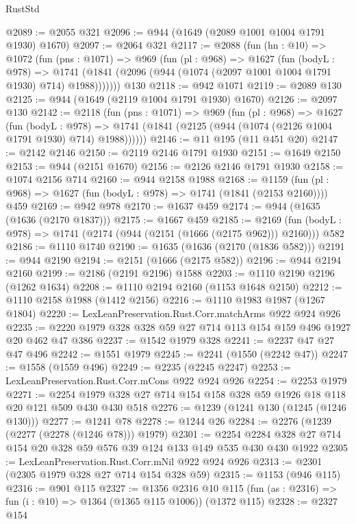 \begin{lexlean}{RustStd}
\begin{coremodule}
{\begin{coremodule}
{{{{{{{{{{@2089 := @2055 @321
@2096 := @944 (@1649 (@2089 @1001 @1004 @1791 @1930) @1670)
@2097 := @2064 @321
@2117 := @2088
    (fun (hn : @10) =>
    @1072
      (fun (pns : @1071) =>
      @969
        (fun (pl : @968) =>
        @1627
          (fun (bodyL : @978) =>
          @1741 (@1841 (@2096 (@944 (@1074 (@2097 @1001 @1004 @1791 @1930) @714) @1988)))))))
    @130
@2118 := @942 @1071
@2119 := @2089 @130
@2125 := @944 (@1649 (@2119 @1004 @1791 @1930) @1670)
@2126 := @2097 @130
@2142 := @2118
    (fun (pns : @1071) =>
    @969
      (fun (pl : @968) =>
      @1627
        (fun (bodyL : @978) =>
        @1741 (@1841 (@2125 (@944 (@1074 (@2126 @1004 @1791 @1930) @714) @1988))))))
@2146 := @11 @195 (@11 @451 @20)
@2147 := @2142 @2146
@2150 := @2119 @2146 @1791 @1930
@2151 := @1649 @2150
@2153 := @944 (@2151 @1670)
@2156 := @2126 @2146 @1791 @1930
@2158 := @1074 @2156 @714
@2160 := @944 @2158 @1988
@2168 := @1159 (fun (pl : @968) => @1627 (fun (bodyL : @978) => @1741 (@1841 (@2153 @2160)))) @459
@2169 := @942 @978
@2170 := @1637 @459
@2174 := @944 (@1635 (@1636 (@2170 @1837)))
@2175 := @1667 @459
@2185 := @2169 (fun (bodyL : @978) => @1741 (@2174 (@944 (@2151 (@1666 (@2175 @962))) @2160))) @582
@2186 := @1110 @1740
@2190 := @1635 (@1636 (@2170 (@1836 @582)))
@2191 := @944 @2190
@2194 := @2151 (@1666 (@2175 @582))
@2196 := @944 @2194 @2160
@2199 := @2186 (@2191 @2196) @1588
@2203 := @1110 @2190 @2196 (@1262 @1634)
@2208 := @1110 @2194 @2160 (@1153 @1648 @2150)
@2212 := @1110 @2158 @1988 (@1412 @2156)
@2216 := @1110 @1983 @1987 (@1267 @1804)
@2220 := LexLeanPreservation.Rust.Corr.matchArms @922 @924 @926
@2235 := @2220 @1979 @328 @328 @59 @27 @714 @113 @154 @159 @496 @1927 @20 @462 @47 @386
@2237 := @1542 @1979 @328
@2241 := @2237 @47 @27 @47 @496
@2242 := @1551 @1979
@2245 := @2241 (@1550 (@2242 @47))
@2247 := @1558 (@1559 @496)
@2249 := @2235 (@2245 @2247)
@2253 := LexLeanPreservation.Rust.Corr.mCons @922 @924 @926
@2254 := @2253 @1979
@2271 := @2254 @1979 @328 @27 @714 @154 @158 @328 @59 @1926 @18 @118 @20 @121 @509 @430 @430 @518
@2276 := @1239 (@1241 @130 (@1245 (@1246 @130)))
@2277 := @1241 @78
@2278 := @1244 @26
@2284 := @2276 (@1239 (@2277 (@2278 (@1246 @78))) @1979)
@2301 := @2254 @2284 @328 @27 @714 @154 @20 @328 @59 @576 @39 @124 @133 @149 @535 @430 @430 @1922
@2305 := LexLeanPreservation.Rust.Corr.mNil @922 @924 @926
@2313 := @2301 (@2305 @1979 @328 @27 @714 @154 @328 @59)
@2315 := @1153 (@946 @115)
@2316 := @901 @115
@2327 := @1356
    @2316
    @10
    @115
    (fun (as : @2316) => fun (i : @10) => @1364 (@1365 @115 @1006))
    (@1372 @115)
@2328 := @2327 @154
}}}}}}}}}}
\end{coremodule}}
\end{coremodule}
\end{lexlean}
